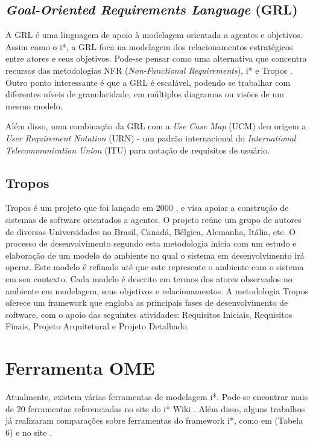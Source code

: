         \subsection{\emph{Goal-Oriented Requirements Language} (GRL)}
            A GRL é uma linguagem de apoio à modelagem orientada a agentes e objetivos.
            Assim como o i*, a GRL foca na modelagem dos relacionamentos estratégicos entre atores e seus objetivos.
            Pode-se pensar como uma alternativa que concentra recursos das metodologias NFR (\emph{Non-Functional Requirements}), i* e Tropos \cite{regev2005goals}.
            Outro ponto interessante é que a GRL é escalável, podendo se trabalhar com diferentes níveis de granularidade, em múltiplos diagramas ou visões de um mesmo modelo.

            Além disso, uma combinação da GRL com a \emph{Use Case Map} (UCM) deu origem a \emph{User Requirement Notation} (URN) - um padrão internacional do \emph{International  Telecommunication  Union} (ITU) para notação de requisitos de usuário.


        \subsection{Tropos}
            Tropos é um projeto que foi lançado em 2000 \cite{mylopoulos2001uml}, e visa apoiar a construção de sistemas de software orientados a agentes.
            O projeto reúne um grupo de autores de diversas Universidades no Brasil, Canadá, Bélgica, Alemanha, Itália, etc.
            O processo de desenvolvimento segundo esta metodologia inicia com um estudo e elaboração de um modelo do ambiente no qual o sistema em desenvolvimento irá operar.
            Este modelo é refinado até que este represente o ambiente com o sistema em seu contexto.
            Cada modelo é descrito em termos dos atores observados no ambiente em modelagem, seus objetivos e relacionamentos.
            A metodologia Tropos oferece um framework que engloba as principais fases de desenvolvimento de software, com o apoio das seguintes atividades: Requisitos Iniciais, Requisitos Finais, Projeto Arquitetural e Projeto Detalhado.

    \section{Ferramenta OME }
        \label{cap:framework-sec:ferramentas}
            Atualmente, existem várias ferramentas de modelagem i*.
            Pode-se encontrar mais de 20 ferramentas referenciadas no site do i* Wiki \cite{site2013iwiki}.
            Além disso, alguns trabalhos já realizaram comparações sobre ferramentas do framework i*,
                como em \cite{santos2008istar}(Tabela 6) e no site \cite{site2013iwiki}.

